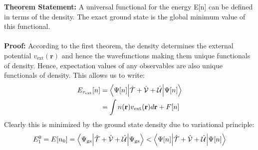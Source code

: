 \textbf{Theorem Statement:} A universal functional for the energy E[n] can be defined in terms of the density. The exact ground state is the global minimum value of this functional. \\ \\
\textbf{Proof:} According to the first theorem, the density determines the external potential $v_{\text{ext}}(\mathbf{r})$ and hence the wavefunctions making them unique functionals of density. Hence, expectation values of any observables are also unique functionals of density. This allows us to write:
\begin{align}
    E_{v_{\text{ext}}}[n] &= \ev**{\hat{\mathcal{T}} + \hat{\mathcal{V}} + \hat{\mathcal{U}}}{\Psi[n]} \\
    &= \int n(\mathbf{r})v_{\text{ext}}(\mathbf{r}) d\mathbf{r} + F[n]
\end{align}
Clearly this is minimized by the ground state density due to variational principle:
\begin{equation}
    E_1^0 = E[n_0] = \ev**{\hat{\mathcal{T}} + \hat{\mathcal{V}} + \hat{\mathcal{U}}}{\Psi_{\text{gs}}} < \ev**{\hat{\mathcal{T}} + \hat{\mathcal{V}} + \hat{\mathcal{U}}}{\Psi[n]}
\end{equation}
